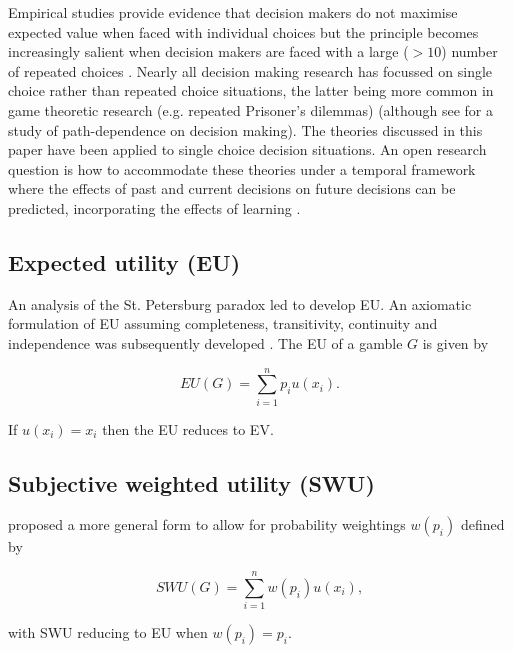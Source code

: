 \documentclass{article}\usepackage[]{graphicx}\usepackage[]{color}
\begin{document}
Empirical studies provide evidence that decision makers do not maximise expected value when faced with individual choices but the principle becomes increasingly salient when decision makers are faced with a large ($> 10$) \citep*{Montgomery_Adelbratt_1982} number of repeated choices \citep*{Lichtenstein_Slovic_Zink_1969, Li_2003, Colbert_Murray_Nieschwietz_2009}. Nearly all decision making research has focussed on single choice rather than repeated choice situations, the latter being more common in game theoretic research (e.g. repeated Prisoner's dilemmas) (although see \citealp[][]{Post_van_den_Assem_Baltussen_Thaler_2008} for a study of path-dependence on decision making). The theories discussed in this paper have been applied to single choice decision situations. An open research question is how to accommodate these theories under a temporal framework where the effects of past and current decisions on future decisions can be predicted, incorporating the effects of learning \cite[see Problem 6][p. 665]{Hastie_2001}.

\subsection{Expected utility (EU)}


An analysis of the St. Petersburg paradox led \cite{Bernoulli_1738_1954} to develop EU.
An axiomatic formulation of EU assuming completeness, transitivity, continuity and independence was subsequently developed \citep[p. 26]{von_Neumann_Morgenstern_1947}. The EU of a gamble $G$ is given by

\begin{equation}
EU(G) = \sum_{i=1}^{n} p_i u(x_i).
\label{eu_equation}
\end{equation}

If $u(x_i) = x_i$ then the EU reduces to EV.

\subsection{Subjective weighted utility (SWU)}

\cite{Edwards_1954, Edwards_1962} proposed a more general form to allow for probability weightings $w(p_i)$ defined by

\begin{equation}
SWU(G) = \sum_{i=1}^{n} w(p_i) u(x_i),
\label{swu_equation}
\end{equation}

with SWU reducing to EU when $w(p_i) = p_i$.
\end{document}
